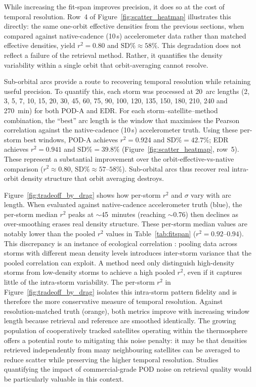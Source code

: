\documentclass[draft]{agujournal2019}
\begin{document}
While increasing the fit-span improves precision, it does so at the cost of
temporal resolution. Row~4 of Figure~\ref{fig:scatter_heatmap} illustrates
this directly: the same one-orbit effective densities from the previous
sections, when compared against native-cadence (10\,s) accelerometer data
rather than matched effective densities, yield $r^{2} = 0.80$ and
$\text{SD\%} \approx 58\%$. This degradation does not reflect a failure of
the retrieval method. Rather, it quantifies the density variability within a
single orbit that orbit-averaging cannot resolve.

Sub-orbital arcs provide a route to recovering temporal resolution while
retaining useful precision. To quantify this, each storm was processed at
20~arc lengths (2, 3, 5, 7, 10, 15, 20, 30, 45, 60, 75, 90, 100, 120,
135, 150, 180, 210, 240 and 270~min) for both POD-A and EDR. For each
storm--satellite--method combination, the ``best'' arc length is the window
that maximises the Pearson correlation against the native-cadence (10\,s)
accelerometer truth. Using these per-storm best windows,
POD-A achieves $r^{2} = 0.924$ and $\text{SD\%} = 42.7\%$; EDR
achieves $r^{2} = 0.941$ and $\text{SD\%} = 39.8\%$
(Figure~\ref{fig:scatter_heatmap}, row~5). These
represent a substantial improvement over the orbit-effective-vs-native
comparison ($r^{2} \approx 0.80$, $\text{SD\%} \approx 57$--$58\%$).
Sub-orbital arcs thus recover real intra-orbit density structure that
orbit averaging destroys.

Figure~\ref{fig:tradeoff_by_drag} shows how per-storm $r^{2}$ and $\sigma$
vary with arc length. When evaluated against native-cadence accelerometer
truth (blue), the per-storm median $r^{2}$ peaks at $\sim$45~minutes
(reaching $\sim$0.76) then declines as over-smoothing erases real density
structure. These per-storm median values are notably lower than the pooled
$r^{2}$ values in Table~\ref{tab:fitspan} ($r^{2} = 0.92$--$0.94$). This
discrepancy is an instance of ecological correlation
\cite{Robinson1950EcologicalIndividuals}: pooling data across storms with
different mean density levels introduces inter-storm variance that the
pooled correlation can exploit. A method need only distinguish
high-density storms from low-density storms to achieve a high pooled
$r^{2}$, even if it captures little of the intra-storm variability. The per-storm
$r^{2}$ in Figure~\ref{fig:tradeoff_by_drag} isolates this intra-storm
pattern fidelity and is therefore the more conservative measure of
temporal resolution. Against resolution-matched truth (orange), both
metrics improve with increasing window length because retrieval and
reference are smoothed identically. The growing population of cooperatively tracked
satellites operating within the thermosphere offers a potential route to
mitigating this noise penalty: it may be that densities retrieved
independently from many neighbouring satellites can be averaged to reduce
scatter while preserving the higher temporal resolution. Studies
quantifying the impact of commercial-grade POD noise on retrieval quality
would be particularly valuable in this context.
\end{document}
